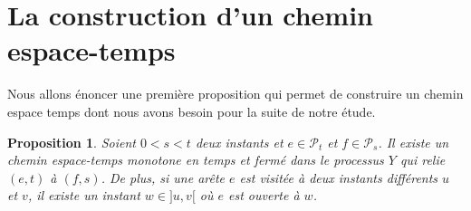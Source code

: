 \documentclass[titlepage,a4paper,12pt]{article}
\newcounter{prop}
\newtheorem{propo}[prop]{Proposition}
\begin{document}
\section{La construction d'un chemin espace-temps}
Nous allons énoncer une première proposition qui permet de construire un chemin espace temps dont nous avons besoin pour la suite de notre étude.

\begin{propo} \label{stc}Soient $0<s<t$ deux instants et $e\in \mathcal{P}_t$ et $f \in \mathcal{P}_s$. Il existe un chemin espace-temps monotone en temps et fermé dans le processus $Y$ qui relie $(e,t)$ à $(f,s)$. De plus, si une arête $e$ est visitée à deux instants différents $u$ et $v$, il existe un instant $w\in ]u,v[$ où $e$ est ouverte à $w$.
\end{propo}
\end{document}
